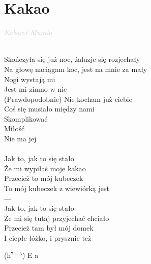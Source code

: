 \documentclass[a5paper, 10pt]{book}
\begin{document}
\section{Kakao}\textcolor{lightgray}{\textit{Kabaret Mumio}}\\~\\
\begin{minipage}[t]{0.8\textwidth}
  Skończyła się już noc, żaluzje się rozjechały\\
  Na głowę naciągam koc, jest na mnie za mały\\
  Nogi wystają mi\\
  Jest mi zimno w nie\\
  (Prawdopodobnie) Nie kocham już ciebie\\

  Coś się musiało między nami\\
  Skomplikować\\
  Miłość\\
  Nie ma jej\\
  \\
  \hspace*{5mm}Jak to, jak to się stało\\
  \hspace*{5mm}Że mi wypiłaś moje kakao\\
  \hspace*{5mm}Przecież to mój kubeczek\\
  \hspace*{5mm}To mój kubeczek z wiewiórką jest\\

  ---\\

  \hspace*{5mm}Jak to, jak to się stało\\
  \hspace*{5mm}Że mi się tutaj przyjechać chciało\\
  \hspace*{5mm}Przecież tam był mój domek\\
  \hspace*{5mm}I ciepłe łóżko, i prysznic też\\
\end{minipage}
\begin{minipage}[t]{0.2\textwidth}
  (h$^{7-5}$) E a\\
  \\
  \\
  \\
\end{minipage}
\end{document}
